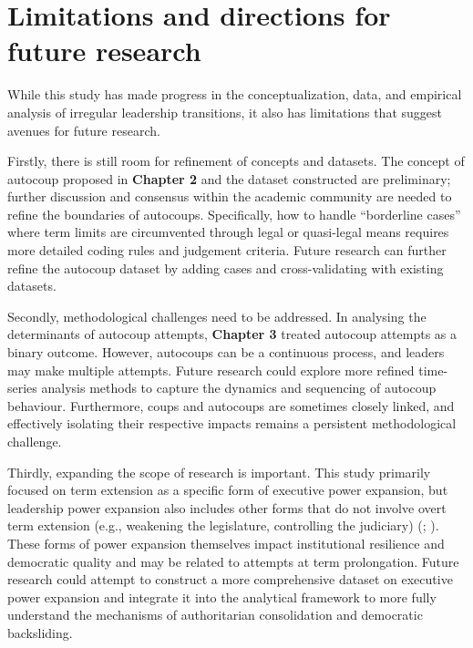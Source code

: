\documentclass[
  12pt,
]{report}
\begin{document}
\section{Limitations and directions for future
research}\label{limitations-and-directions-for-future-research}

While this study has made progress in the conceptualization, data, and
empirical analysis of irregular leadership transitions, it also has
limitations that suggest avenues for future research.

Firstly, there is still room for refinement of concepts and datasets.
The concept of autocoup proposed in \textbf{Chapter 2} and the dataset
constructed are preliminary; further discussion and consensus within the
academic community are needed to refine the boundaries of autocoups.
Specifically, how to handle ``borderline cases'' where term limits are
circumvented through legal or quasi-legal means requires more detailed
coding rules and judgement criteria. Future research can further refine
the autocoup dataset by adding cases and cross-validating with existing
datasets.

Secondly, methodological challenges need to be addressed. In analysing
the determinants of autocoup attempts, \textbf{Chapter 3} treated
autocoup attempts as a binary outcome. However, autocoups can be a
continuous process, and leaders may make multiple attempts. Future
research could explore more refined time-series analysis methods to
capture the dynamics and sequencing of autocoup behaviour. Furthermore,
coups and autocoups are sometimes closely linked, and effectively
isolating their respective impacts remains a persistent methodological
challenge.

Thirdly, expanding the scope of research is important. This study
primarily focused on term extension as a specific form of executive
power expansion, but leadership power expansion also includes other
forms that do not involve overt term extension (e.g., weakening the
legislature, controlling the judiciary)
(;
). These forms of
power expansion themselves impact institutional resilience and
democratic quality and may be related to attempts at term prolongation.
Future research could attempt to construct a more comprehensive dataset
on executive power expansion and integrate it into the analytical
framework to more fully understand the mechanisms of authoritarian
consolidation and democratic backsliding.
\end{document}
